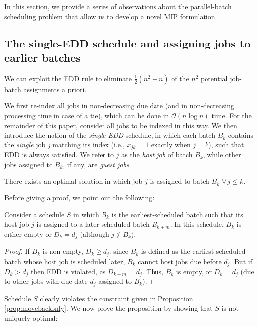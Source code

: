 \documentclass[oribibl]{llncs}
\begin{document}
In this section, we provide a series of observations about the
parallel-batch scheduling problem that allow us to develop a novel MIP
formulation.

\subsection{The single-EDD schedule and assigning jobs to earlier batches}
We can exploit the EDD rule to eliminate $\frac{1}{2}(n^2 - n)$ of the
$n^2$ potential job-batch assignments a priori.

We first re-index all jobs in non-decreasing due date (and in
non-decreasing processing time in case of a tie), which can be done in
$\mathcal{O}(n \log n)$ time. For the remainder of this paper, consider
all jobs to be indexed in this way. We then introduce the notion of
the \textit{single-EDD} schedule, in which each batch $B_k$ contains the
\textit{single} job $j$ matching its index (i.e., $x_{jk}=1$ exactly when
$j=k$), such that EDD is always satisfied. We refer to $j$ as the \textit{host
job} of batch $B_k$, while other jobs assigned to $B_k$, if any, are \textit{guest jobs}.

\begin{proposition} \label{prop:movebackonly}
There exists an optimal solution in which job $j$ is assigned to batch
$B_k \; \forall \,j \leq k$.
\end{proposition}

Before giving a proof, we point out the following:
\begin{lemma}
  \label{lemma:emptyorsame}
Consider a schedule $S$ in which $B_k$ is the earliest-scheduled batch such that its
host job $j$ is assigned to a later-scheduled batch $B_{k+m}$. In this schedule,
$B_k$ is either empty or $D_k = d_j$ (although $j \notin B_k$).
\end{lemma}
\begin{proof}
If $B_k$ is non-empty, $D_k \geq d_j$: since $B_k$ is defined as
the earliest scheduled batch whose host job is scheduled later, $B_k$ cannot
host jobs due before $d_j$. But if $D_k > d_j$ then EDD is violated, as $D_{k+m}
= d_j$. Thus, $B_k$ is empty, or $D_k = d_j$ (due to other jobs with due date $d_j$ assigned to
$B_k$).
\end{proof}

Schedule $S$ clearly violates the constraint given in Proposition
\ref{prop:movebackonly}. We now prove the proposition by showing that $S$ is
not uniquely optimal:
\end{document}

